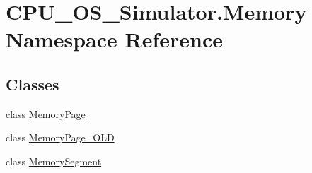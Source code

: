 \hypertarget{namespace_c_p_u___o_s___simulator_1_1_memory}{}\section{C\+P\+U\+\_\+\+O\+S\+\_\+\+Simulator.\+Memory Namespace Reference}
\label{namespace_c_p_u___o_s___simulator_1_1_memory}
\subsection*{Classes}
\begin{DoxyCompactItemize}
\item 
class \hyperlink{class_c_p_u___o_s___simulator_1_1_memory_1_1_memory_page}{Memory\+Page}
\item 
class \hyperlink{class_c_p_u___o_s___simulator_1_1_memory_1_1_memory_page___o_l_d}{Memory\+Page\+\_\+\+O\+L\+D}
\item 
class \hyperlink{class_c_p_u___o_s___simulator_1_1_memory_1_1_memory_segment}{Memory\+Segment}
\end{DoxyCompactItemize}
